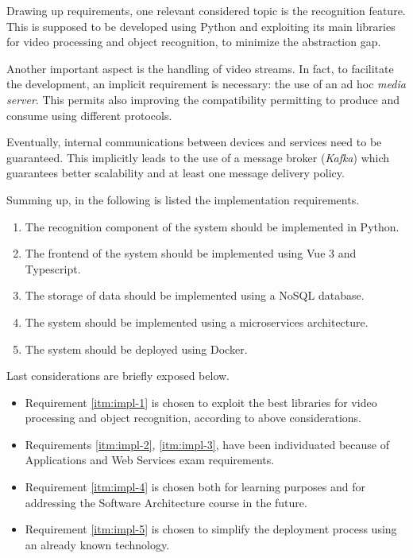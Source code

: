 \documentclass{scrartcl}
\begin{document}
    Drawing up requirements, one relevant considered topic is the recognition feature.
    This is supposed to be developed using Python and exploiting its main libraries for video processing and object recognition, to minimize the abstraction gap.

    Another important aspect is the handling of video streams.
    In fact, to facilitate the development, an implicit requirement is necessary: the use of an ad hoc \textit{media server}.
    This permits also improving the compatibility permitting to produce and consume using different protocols.

    Eventually, internal communications between devices and services need to be guaranteed.
    This implicitly leads to the use of a message broker (\textit{Kafka}) which guarantees better scalability and at least one message delivery policy.

    Summing up, in the following is listed the implementation requirements.

    \begin{enumerate}
        \item \label{itm:impl-1} The recognition component of the system should be implemented in Python.
        \item \label{itm:impl-2} The frontend of the system should be implemented using Vue 3 and Typescript.
        \item \label{itm:impl-3} The storage of data should be implemented using a NoSQL database.
        \item \label{itm:impl-4} The system should be implemented using a microservices architecture.
        \item \label{itm:impl-5} The system should be deployed using Docker.
    \end{enumerate}

    Last considerations are briefly exposed below.

    \begin{itemize}
        \item Requirement \ref{itm:impl-1} is chosen to exploit the best libraries for video processing and object recognition, according to above considerations.
        \item Requirements \ref{itm:impl-2}, \ref{itm:impl-3}, have been individuated because of Applications and Web Services exam requirements.
        \item Requirement \ref{itm:impl-4} is chosen both for learning purposes and for addressing the Software Architecture course in the future.
        \item Requirement \ref{itm:impl-5} is chosen to simplify the deployment process using an already known technology.
    \end{itemize}
\end{document}
